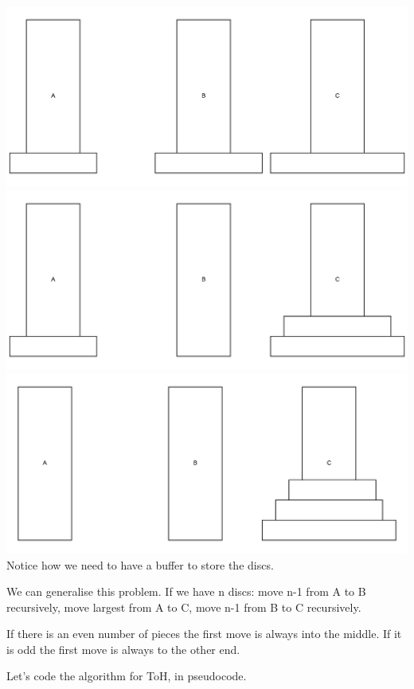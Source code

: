 \documentclass{article}
\begin{document}
 \includegraphics[width=\textwidth,height=\textheight,keepaspectratio]{images/frame_5_delay-1s.png}
 \includegraphics[width=\textwidth,height=\textheight,keepaspectratio]{images/frame_6_delay-1s.png}
 \includegraphics[width=\textwidth,height=\textheight,keepaspectratio]{images/frame_7_delay-1s.png}
 Notice how we need to have a buffer to store the discs.
 
 We can generalise this problem. If we have n discs: move n-1 from A to B recursively, move largest from A to C, move n-1 from B to C recursively.
 
 If there is an even number of pieces the first move is always into the middle. If it is odd the first move is always to the other end.
 
 Let's  code the algorithm for ToH, in pseudocode.
 
\end{document}
